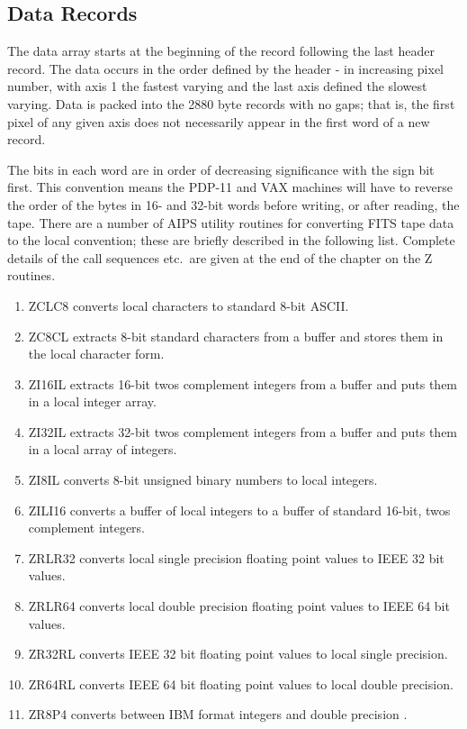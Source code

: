\subsection{Data Records }
The data array starts at the beginning of the record following the
last header record.  The data occurs in the order defined by the
header - in increasing pixel number, with axis 1 the fastest varying
and the last axis defined the slowest varying.  Data is packed into
the 2880 byte records with no gaps; that is, the first pixel of any
given axis does not necessarily appear in the first word of a new
record.

The bits in each word are in order of decreasing significance with the
sign bit first.  This convention means the PDP-11 and VAX machines
will have to reverse the order of the bytes in 16- and 32-bit words
before writing, or after reading, the tape.  There are a number of AIPS
utility routines for converting FITS tape data to the local
convention; these are briefly described in the following list.
Complete details of the call sequences etc.~are given at the end of
the chapter on the Z routines.
\begin{enumerate} %
\item ZCLC8 converts local characters to standard 8-bit ASCII.
\item ZC8CL extracts 8-bit standard characters from a
buffer and stores them in the local character form.
\item ZI16IL extracts 16-bit twos complement integers
from a buffer and puts them in a local integer array.
\item ZI32IL extracts 32-bit twos complement integers
from a buffer and puts them in a local array of integers.
\item ZI8IL converts 8-bit unsigned binary numbers to
local integers.
\item ZILI16 converts a buffer of local integers
to a buffer of standard 16-bit, twos complement integers.
\item ZRLR32 converts local single precision floating
point values to IEEE 32 bit values.
\item ZRLR64 converts local double precision floating
point values to IEEE 64 bit values.
\item ZR32RL converts IEEE 32 bit floating point values
to local single precision.
\item ZR64RL converts IEEE 64 bit floating point values
to local double precision.
\item ZR8P4 converts between IBM format integers and
double precision .

\end{enumerate} %
